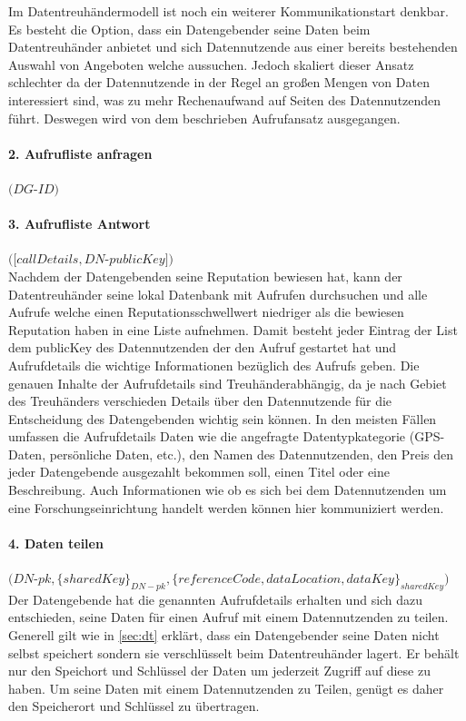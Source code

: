 \documentclass[11pt,a4paper]{scrreprt}
\begin{document}
Im Datentreuhändermodell ist noch ein weiterer Kommunikationstart denkbar. Es besteht die Option, dass ein Datengebender seine Daten beim Datentreuhänder anbietet und sich Datennutzende aus einer bereits bestehenden Auswahl von Angeboten welche aussuchen. Jedoch skaliert dieser Ansatz schlechter da der Datennutzende in der Regel an großen Mengen von Daten interessiert sind, was zu mehr Rechenaufwand auf Seiten des Datennutzenden führt. Deswegen wird von dem beschrieben Aufrufansatz ausgegangen.

\paragraph{2. Aufrufliste anfragen} $(DG$-$ID)$

\paragraph{3. Aufrufliste Antwort} $([callDetails, DN$-$publicKey])$\\
Nachdem der Datengebenden seine Reputation bewiesen hat, kann der Datentreuhänder seine lokal Datenbank mit Aufrufen durchsuchen und alle Aufrufe welche einen Reputationsschwellwert niedriger als die bewiesen Reputation haben in eine Liste aufnehmen. Damit besteht jeder Eintrag der List dem publicKey des Datennutzenden der den Aufruf gestartet hat und Aufrufdetails die wichtige Informationen bezüglich des Aufrufs geben. Die genauen Inhalte der Aufrufdetails sind Treuhänderabhängig, da je nach Gebiet des Treuhänders verschieden Details über den Datennutzende für die Entscheidung des Datengebenden wichtig sein können. In den meisten Fällen umfassen die Aufrufdetails Daten wie die angefragte Datentypkategorie (GPS-Daten, persönliche Daten, etc.), den Namen des Datennutzenden, den Preis den jeder Datengebende ausgezahlt bekommen soll, einen Titel oder eine Beschreibung. Auch Informationen wie ob es sich bei dem Datennutzenden um eine Forschungseinrichtung handelt werden können hier kommuniziert werden.


\paragraph{4. Daten teilen} $(DN$-$pk, \{sharedKey\}_{DN-pk}, \{referenceCode, dataLocation, dataKey\}_{sharedKey})$\\
Der Datengebende hat die genannten Aufrufdetails erhalten und sich dazu entschieden, seine Daten für einen Aufruf mit einem Datennutzenden zu teilen. Generell gilt wie in \ref{sec:dt} erklärt, dass ein Datengebender seine Daten nicht selbst speichert sondern sie verschlüsselt beim Datentreuhänder lagert. Er behält nur den Speichort und Schlüssel der Daten um jederzeit Zugriff auf diese zu haben. Um seine Daten mit einem Datennutzenden zu Teilen, genügt es daher den Speicherort und Schlüssel zu übertragen.
\end{document}
